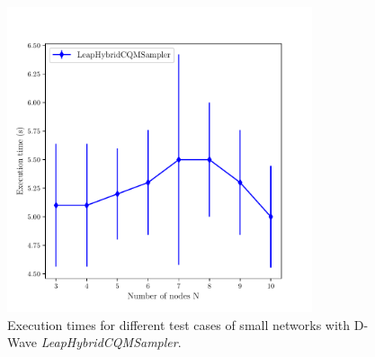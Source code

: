 \begin{figure}[H]
  \begin{center}
\includegraphics[width=0.8\textwidth]{Figures/ExecutionTimes.pdf}
  \end{center}
  \caption{Execution times for different test cases of small networks with D-Wave \textit{LeapHybridCQMSampler}.}
  \label{fig: ExecutionTimes}
\end{figure}

